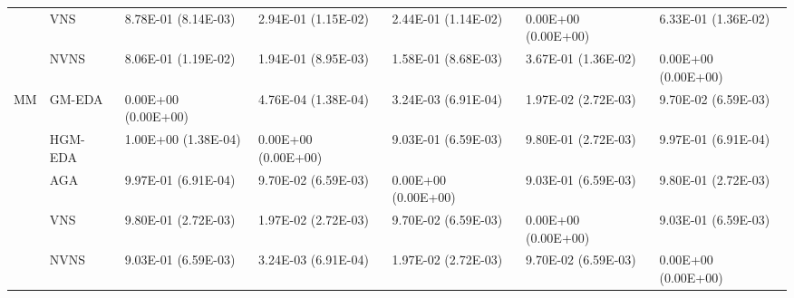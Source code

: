 \begin{tabular}{lllllll}
   & VNS &  8.78E-01 (8.14E-03) &  2.94E-01 (1.15E-02) &  2.44E-01 (1.14E-02) &  0.00E+00 (0.00E+00) &  6.33E-01 (1.36E-02) \\
   & NVNS &  8.06E-01 (1.19E-02) &  1.94E-01 (8.95E-03) &  1.58E-01 (8.68E-03) &  3.67E-01 (1.36E-02) &  0.00E+00 (0.00E+00) \\
MM & GM-EDA &  0.00E+00 (0.00E+00) &  4.76E-04 (1.38E-04) &  3.24E-03 (6.91E-04) &  1.97E-02 (2.72E-03) &  9.70E-02 (6.59E-03) \\
   & HGM-EDA &  1.00E+00 (1.38E-04) &  0.00E+00 (0.00E+00) &  9.03E-01 (6.59E-03) &  9.80E-01 (2.72E-03) &  9.97E-01 (6.91E-04) \\
   & AGA &  9.97E-01 (6.91E-04) &  9.70E-02 (6.59E-03) &  0.00E+00 (0.00E+00) &  9.03E-01 (6.59E-03) &  9.80E-01 (2.72E-03) \\
   & VNS &  9.80E-01 (2.72E-03) &  1.97E-02 (2.72E-03) &  9.70E-02 (6.59E-03) &  0.00E+00 (0.00E+00) &  9.03E-01 (6.59E-03) \\
   & NVNS &  9.03E-01 (6.59E-03) &  3.24E-03 (6.91E-04) &  1.97E-02 (2.72E-03) &  9.70E-02 (6.59E-03) &  0.00E+00 (0.00E+00) \\
\bottomrule
\end{tabular}
